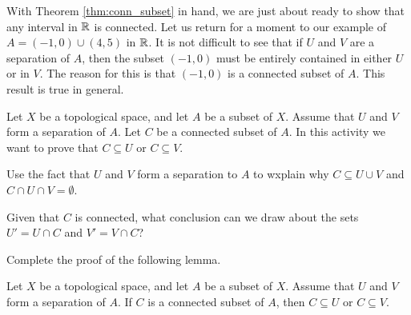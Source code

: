 \label{sec_connect_subset_rn}

With Theorem \ref{thm:conn_subset} in hand, we are just about ready to show that any interval in $\mathbb{R}$ is connected. Let us return for a moment to our example of $A = (-1,0) \cup (4,5)$ in $\mathbb{R}$. It is not difficult to see that if $U$ and $V$ are a separation of $A$, then the subset $(-1,0)$ must be entirely contained in either $U$ or in $V$. The reason for this is that $(-1,0)$ is a connected subset of $A$. This result is true in general.

\begin{activity} Let $X$ be a topological space, and let $A$ be a subset of $X$. Assume that $U$ and $V$ form a separation of $A$. Let $C$ be a connected subset of $A$. In this activity we want to prove that $C \subseteq U$ or $C \subseteq V$. 
\ba

\item Use the fact that $U$ and $V$ form a separation to $A$ to wxplain why $C \subseteq U \cup V$ and $C \cap U \cap V = \emptyset$. 

\item Given that $C$ is connected, what conclusion can we draw about the sets $U' = U \cap C$ and $V' = V \cap C$?

\item Complete the proof of the following lemma.

\begin{lemma} \label{lem:separation_subset} Let $X$ be a topological space, and let $A$ be a subset of $X$. Assume that $U$ and $V$ form a separation of $A$. If $C$ is a connected subset of $A$, then $C \subseteq U$ or $C \subseteq V$. 
\end{lemma}

\ea

\end{activity}

\begin{comment}

\ActivitySolution

\ba
\item Since $U$ and $V$ form a separation of $A$, we know that $A \subseteq U \cup V$ and $U \cap V \cap A = \emptyset$. Then $C \subseteq A \subseteq U \cup V$ and $U \cap V \cap C \subseteq U \cap V \cap A = \emptyset$.

\item If $U' = U \cap C \neq \emptyset$ and $V' = V \cap C \neq \emptyset$, then $U$ and $V$ form a separation of $C$. But $C$ is connected, so this is impossible. We conclude that either $U' = \emptyset$ or $V' = \emptyset$

\item If $U' = U \cap C= \emptyset$, the fact that $C \subseteq U \cup V$ implies that $C \subseteq V$. Similarly, if $V' = V \cap C = \emptyset$, then $C \subseteq U$. We conclude that $C \subseteq U$ or $C \subseteq V$.

\ea

\end{comment}

